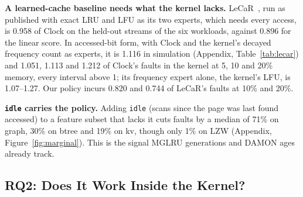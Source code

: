\documentclass{article}
\newcommand{\clock}{Clock\xspace}
\newcommand{\feat}[1]{\texttt{#1}}         %
\newcommand{\wsixteen}{../week_16_update/tables}
\newcommand{\finding}[1]{\textbf{#1}\hspace{0.4em}}
\begin{document}
\finding{A learned-cache baseline needs what the kernel lacks.}
LeCaR~\citep{vietri2018lecar}, run as published with exact LRU and LFU as its two
experts, which needs every access, is 0.958 of \clock on the held-out streams of the six
workloads, against 0.896 for the linear score. In accessed-bit form, with \clock and the
kernel's decayed frequency count as experts, it is 1.116 in simulation (Appendix,
Table~\ref{tab:lecar}) and 1.051, 1.113 and 1.212 of \clock's faults in the kernel at 5,
10 and 20\% memory, every interval above 1; its frequency expert alone, the kernel's LFU,
is 1.07--1.27. Our policy incurs 0.820 and 0.744 of LeCaR's faults at 10\% and 20\%.

\finding{\feat{idle} carries the policy.} Adding \feat{idle} (scans since the page was
last found accessed) to a feature subset that lacks it cuts faults by a median of 71\% on
graph, 30\% on btree and 19\% on kv, though only 1\% on LZW (Appendix,
Figure~\ref{fig:marginal}). This is the signal MGLRU generations and DAMON ages already
track.


\subsection{RQ2: Does It Work Inside the Kernel?}
\label{sec:eval-kernel}

\begin{table}[t]
\caption{\textbf{Every policy on every workload, in the xv6 kernel, at 10\% memory} (74
streams). Faults relative to \clock: one column per workload (geometric mean over its
streams), last column the mean over the 14 workloads. S3-FIFO, LeCaR, LHD and ARC in
accessed-bit form. ``Linear, 32 sampled'' is our policy; ``linear, global'' is the same
score over all candidates. The 5\% and 20\% tables are in Appendix~\ref{app:results}.}
\label{tab:kernel}
\vskip 0.1in
\begin{center}
\resizebox{\textwidth}{!}{}
\end{center}
\vskip -0.1in
\end{table}
\end{document}
